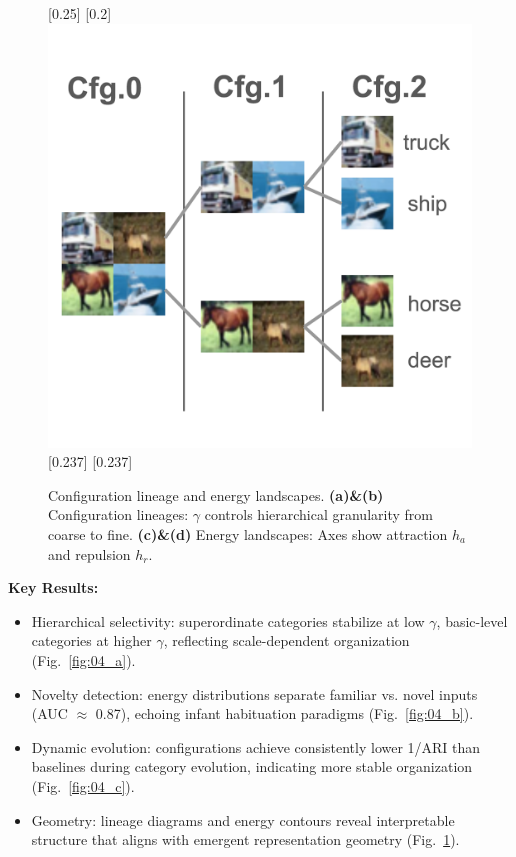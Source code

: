 \begin{figure}[ht]
  \centering
  \vspace{-0.5em}
  [0.25\linewidth]{%
  }
  [0.2\linewidth]{%
    \includegraphics[width=\linewidth]{assets/1003_infantconfig/01_cifar10subset.png}%
  }
  [0.237\linewidth]{%
  }
  [0.237\linewidth]{%
  }
  \caption{
    Configuration lineage and energy landscapes. 
    \textbf{(a)\&(b)} Configuration lineages: $\gamma$ controls hierarchical granularity from coarse to fine. 
    \textbf{(c)\&(d)} Energy landscapes: Axes show attraction $h_a$ and repulsion $h_r$.}
  \label{fig:01_lineage_har}
\end{figure}

\textbf{Key Results:}
\begin{itemize}[leftmargin=1.2em, itemsep=0.1em]
  \item Hierarchical selectivity: superordinate categories stabilize at low \(\gamma\), basic-level categories at higher \(\gamma\), reflecting scale-dependent organization (Fig.~\ref{fig:04_a}).
  \item Novelty detection: energy distributions separate familiar vs. novel inputs (AUC \(\approx\) 0.87), echoing infant habituation paradigms (Fig.~\ref{fig:04_b}).
  \item Dynamic evolution: configurations achieve consistently lower 1/ARI than baselines during category evolution, indicating more stable organization (Fig.~\ref{fig:04_c}).
  \item Geometry: lineage diagrams and energy contours reveal interpretable structure that aligns with emergent representation geometry (Fig.~\ref{fig:01_lineage_har}).
\end{itemize}

